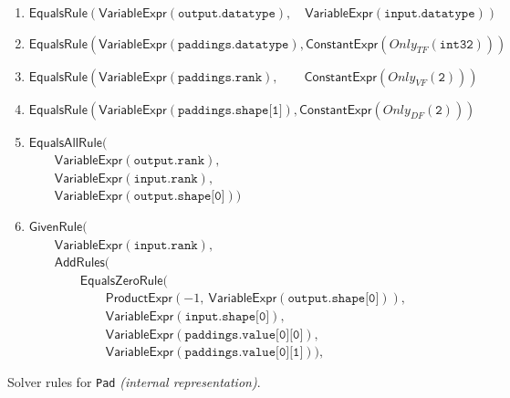 \documentclass[11pt]{article}
\begin{document}
\begin{figure}[!h]
\centering
    \caption{Solver rules for \texttt{Pad} \textit{(internal representation)}.}
    \label{fig-analyser-pad-internalrules}
    \vspace{-1em}
    \begin{enumerate}[noitemsep]
        \item $\textsf{EqualsRule}(\textsf{VariableExpr}(\texttt{output.datatype}),\quad \textsf{VariableExpr}(\texttt{input.datatype}))$
        
        \item $\textsf{EqualsRule}(\textsf{VariableExpr}(\texttt{paddings.datatype}), \textsf{ConstantExpr}(Only_{TF}(\texttt{int32})))$
        
        \item $\textsf{EqualsRule}(\textsf{VariableExpr}(\texttt{paddings.rank}),\qquad \textsf{ConstantExpr}(Only_{VF}(\texttt{2})))$
        
        \item $\textsf{EqualsRule}(\textsf{VariableExpr}(\texttt{paddings.shape[1]}), \textsf{ConstantExpr}(Only_{DF}(\texttt{2})))$
        
        \item $\textsf{EqualsAllRule}($ \\
        $\qquad\textsf{VariableExpr}(\texttt{output.rank}),$ \\
        $\qquad\textsf{VariableExpr}(\texttt{input.rank}),$ \\        $\qquad\textsf{VariableExpr}(\texttt{output.shape[0]}))$ \\
        
        \item $\textsf{GivenRule}($ \\
        $\qquad\textsf{VariableExpr}(\texttt{input.rank}),$ \\
        $\qquad\textsf{AddRules}($ \\
        
        $\qquad\qquad\textsf{EqualsZeroRule}($\\
        $\qquad\qquad\qquad\textsf{ProductExpr}(-1,\ \textsf{VariableExpr}(\texttt{output.shape[0]})) ,$ \\
        $\qquad\qquad\qquad\textsf{VariableExpr}(\texttt{input.shape[0]}) ,$ \\
        $\qquad\qquad\qquad\textsf{VariableExpr}(\texttt{paddings.value[0][0]}) ,$ \\
        $\qquad\qquad\qquad\textsf{VariableExpr}(\texttt{paddings.value[0][1]})), $ \\
        

\end{enumerate}
\end{figure}
\end{document}
